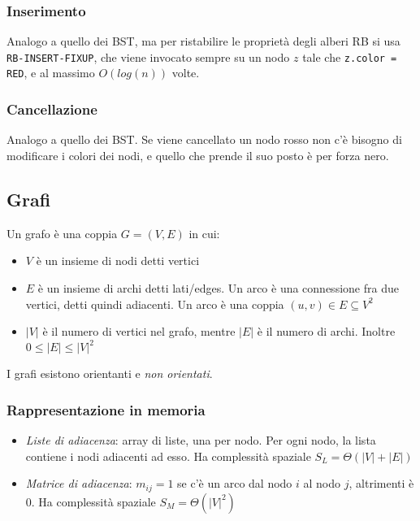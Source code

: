 \documentclass[10pt,a4paper]{article}
\newcommand{\code}{\texttt}
\begin{document}
\begin{multicols*}{2}
\subsubsection*{Inserimento}
Analogo a quello dei BST, ma per ristabilire le proprietà degli alberi RB si usa \code{RB-INSERT-FIXUP}, che viene invocato sempre su un nodo $z$ tale che \code{z.color = RED}, e al massimo $O(log(n))$ volte.
\subsubsection*{Cancellazione}
Analogo a quello dei BST. Se viene cancellato un nodo rosso non c'è bisogno di modificare i colori dei nodi, e quello che prende il suo posto è per forza nero.

\subsection*{Grafi}
Un grafo è una coppia $G = (V,E)$ in cui:
\begin{itemize}
    \item $V$ è un insieme di nodi detti vertici
    \item $E$ è un insieme di archi detti lati/edges. Un arco è una connessione fra due vertici, detti quindi adiacenti. Un arco è una coppia $(u,v) \in E \subseteq V^2$
    \item $|V|$ è il numero di vertici nel grafo, mentre $|E|$ è il numero di archi. Inoltre $0 \le |E| \le |V|^2$
\end{itemize}
I grafi esistono orientanti e \emph{non orientati}.
\subsubsection*{Rappresentazione in memoria}
\begin{itemize}
    \item \emph{Liste di adiacenza}: array di liste, una per nodo. Per ogni nodo, la lista contiene i nodi adiacenti ad esso. Ha complessità spaziale $S_L = \varTheta(|V|+|E|)$
    \item \emph{Matrice di adiacenza}: $m_{ij} = 1$ se c'è un arco dal nodo $i$ al nodo $j$, altrimenti è $0$. Ha complessità spaziale $S_M = \varTheta(|V|^2)$
\end{itemize}

\end{multicols*}
\end{document}
